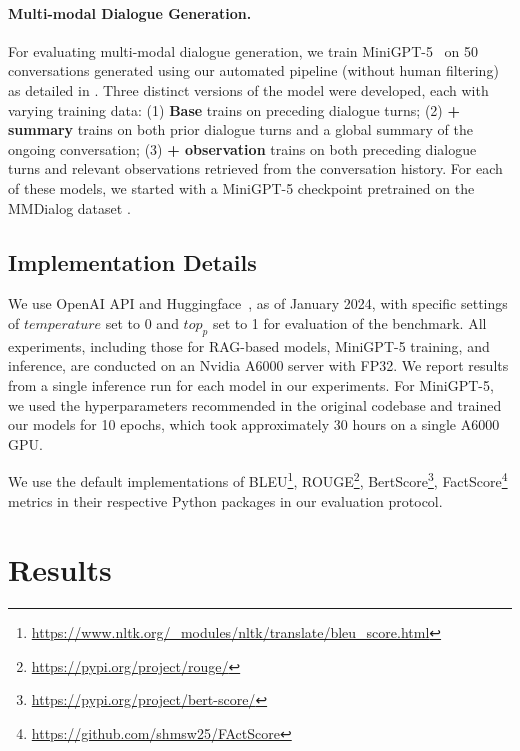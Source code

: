 \paragraph{Multi-modal Dialogue Generation.}
For evaluating multi-modal dialogue generation, we train MiniGPT-5~\cite{zheng2023minigpt} on 50 conversations generated using our automated pipeline (without human filtering) as detailed in .
Three distinct versions of the model were developed, each with varying training data:
(1) \textbf{Base} trains on preceding dialogue turns;
(2) \textbf{+ summary} trains on both prior dialogue turns and a global summary of the ongoing conversation;
(3) \textbf{+ observation} trains on both preceding dialogue turns and relevant observations retrieved from the conversation history.
For each of these models, we started with a MiniGPT-5 checkpoint pretrained on the MMDialog dataset \cite{feng2023mmdialog}.

\subsection{Implementation Details}
We use OpenAI API and Huggingface~\cite{wolf-etal-2020-transformers}, as of January 2024, with specific settings of $temperature$ set to 0 and $top_p$ set to 1 for evaluation of the \dataset{} benchmark. All experiments, including those for RAG-based models, MiniGPT-5 training, and inference, are conducted on an Nvidia A6000 server with FP32. We report results from a single inference run for each model in our experiments. For MiniGPT-5, we used the hyperparameters recommended in the original codebase and trained our models for 10 epochs, which took approximately 30 hours on a single A6000 GPU.

We use the default implementations of BLEU\footnote{\url{https://www.nltk.org/_modules/nltk/translate/bleu_score.html}}, ROUGE\footnote{\url{https://pypi.org/project/rouge/}}, BertScore\footnote{\url{https://pypi.org/project/bert-score/}}, FactScore\footnote{\url{https://github.com/shmsw25/FActScore}} metrics in their respective Python packages in our evaluation protocol.

\section{Results}

